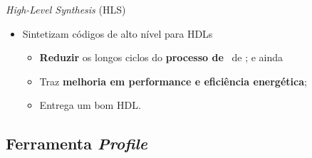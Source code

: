    
      \begin{frame}{\textit{High-Level Synthesis} (HLS)} \vspace{-1em}
         \begin{itemize}
            \setlength{\itemsep}{0.9em}
            \item Sintetizam códigos de alto nível para HDLs \cite{Choi2016} \cite{Trevett2008}
            \begin{itemize}
               \setlength{\itemsep}{1.2em}
               \item \textbf{Reduzir} os longos ciclos do \textbf{processo de \design}\ de \hardware; e ainda
               \item Traz \textbf{melhoria em performance e eficiência energética};
               \item Entrega um bom HDL.
            \end{itemize}
            
            
         \end{itemize}
      \end{frame}
   
   
   \subsection{Ferramenta {\it Profile}}

